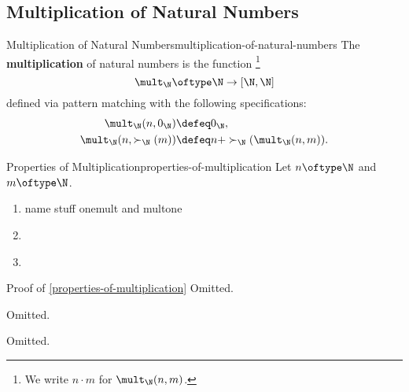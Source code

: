 \subsection{Multiplication of Natural Numbers}\label{subsection-martin-löf-type-theory-multiplication-of-natural-numbers}
\begin{definition}{Multiplication of Natural Numbers}{multiplication-of-natural-numbers}%
    The \textbf{multiplication} of natural numbers is the function%
    \footnote{%
        We write $n\cdot m$ for $\mult_{\N}(n,m)$.
        \par\vspace*{\TCBBoxCorrection}
    }%
    \[
        \mult_{\N}%
        \oftype%
        \N%
        \to%
        [\N,\N]%
    \]%
    defined via pattern matching with the following specifications:%
    \begin{align*}
        \mult_{\N}(n,0_{\N})        &\defeq 0_{\N},\\
        \mult_{\N}(n,\succ_{\N}(m)) &\defeq n+\succ_{\N}(\mult_{\N}(n,m)).%
    \end{align*}
\end{definition}
\begin{proposition}{Properties of Multiplication}{properties-of-multiplication}%
    Let $n\oftype\N$ and $m\oftype\N$.
    \begin{enumerate}
        \item\label{properties-of-multiplication-unitality}name stuff onemult and multone
        \item\label{properties-of-multiplication-associativity}
        \item\label{properties-of-multiplication-commutativity}
    \end{enumerate}
\end{proposition}
\begin{Proof}{Proof of \cref{properties-of-multiplication}}%
    Omitted.

    Omitted.

    Omitted.
\end{Proof}
